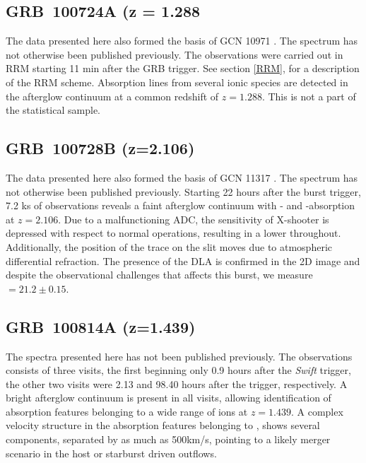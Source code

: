 \documentclass{aa}    %
\begin{document}
\subsection{GRB~100724A (z = 1.288} \label{100724}

The data presented here also formed the basis of GCN 10971 \citep{GCN10971}. The
spectrum has not otherwise been published previously. The observations were
carried out in RRM starting 11 min after the GRB trigger. See section \ref{RRM},
for a description of the RRM scheme. Absorption lines from several ionic species
are detected in the afterglow continuum at a common redshift of $z = 1.288$.
This is not a part of the statistical sample.

\subsection{GRB~100728B (z=2.106)} \label{100728}

The data presented here also formed the basis of GCN 11317 \citep{GCN11317}. The
spectrum has not otherwise been published previously. Starting 22 hours after
the burst trigger, 7.2 ks of observations reveals a faint afterglow continuum
with \lya- and \mgii-absorption at $z=2.106$. Due to a malfunctioning ADC, the
sensitivity of X-shooter is depressed with respect to normal operations,
resulting in a lower throughout. Additionally, the position of the trace on the
slit moves due to atmospheric differential refraction. The presence of the DLA
is confirmed in the 2D image and despite the observational challenges that
affects this burst, we measure \nh~$=21.2 \pm 0.15$.

\subsection{GRB~100814A (z=1.439)} \label{100814}

The spectra presented here has not been published previously. The observations
consists of three visits, the first beginning only 0.9 hours after the
\textit{Swift} trigger, the other two visits were 2.13 and 98.40 hours after the
trigger, respectively. A bright afterglow continuum is present in all visits,
allowing identification of absorption features belonging to a wide range of ions
at $z=1.439$. A complex velocity structure in the absorption features belonging
to \mgii, shows several components, separated by as much as 500km/s, pointing to
a likely merger scenario in the host or starburst driven outflows.
\end{document}
